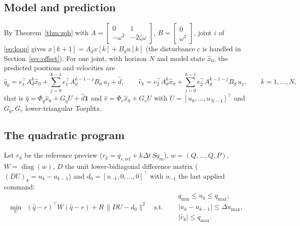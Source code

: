 \documentclass[11pt,a4paper]{article}
\theoremstyle{remark}
\theoremstyle{definition}
\newcommand{\diag}{\operatorname{diag}}
\begin{document}
\subsection{Model and prediction}
By Theorem~\ref{thm:zoh} with $A=\begin{bmatrix}0&1\\-\omega^2&-2\zeta\omega\end{bmatrix}$, $B=\begin{bmatrix}0\\\omega^2\end{bmatrix}$, joint $i$ of \eqref{eq:loop} gives $x[k+1]=A_dx[k]+B_du[k]$ (the disturbance $c$ is handled in Section~\ref{sec:offset}).
For one joint, with horizon $N$ and model state $\hat x_0$, the predicted positions and velocities are
\begin{equation}\label{eq:pred}
\hat q_k=e_1^\top A_d^{k}\hat x_0+\sum_{j=0}^{k-1}e_1^\top A_d^{k-1-j}B_d\,u_j+\hat d,\qquad
\hat v_k=e_2^\top A_d^{k}\hat x_0+\sum_{j=0}^{k-1}e_2^\top A_d^{k-1-j}B_d\,u_j,\qquad k=1,\dots,N,
\end{equation}
that is $\hat q=\Phi_q\hat x_0+G_qU+\hat d\mathbf 1$ and $\hat v=\Phi_v\hat x_0+G_vU$ with $U=[u_0,\dots,u_{N-1}]^\top$ and $G_q,G_v$ lower-triangular Toeplitz.

\subsection{The quadratic program}
Let $r_k$ be the reference preview ($r_k=q_{s,\mathrm{ref}}+k\Delta t\,S\dot q_m$), $w=(Q,\dots,Q,P)$, $W=\diag(w)$, $D$ the unit lower-bidiagonal difference matrix ($(DU)_k=u_k-u_{k-1}$) and $d_0=[u_{-1},0,\dots,0]^\top$ with $u_{-1}$ the last applied command:
\begin{equation}\label{eq:mpc}
\min_{U}\ \ (\hat q-r)^\top W(\hat q-r)+R\,\|DU-d_0\|^2\quad\text{s.t.}\quad
\begin{aligned}
&q_{\min}\le u_k\le q_{\max},\\
&|u_k-u_{k-1}|\le\Delta u_{\max},\\
&|\hat v_k|\le\dot q_{\max}.
\end{aligned}
\end{equation}
\end{document}
